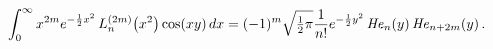 \[\int_{0}^{\infty}x^{2m}e^{-\frac{1}{2}x^{2}}\mathop{L^{(2m)}_{n}\/}\nolimits\!%
\left(x^{2}\right)\mathop{\cos\/}\nolimits\!\left(xy\right)dx=(-1)^{m}\sqrt{%
\tfrac{1}{2}\pi}\frac{1}{n!}e^{-\frac{1}{2}y^{2}}\mathop{\mathit{He}_{n}\/}%
\nolimits\!\left(y\right)\mathop{\mathit{He}_{n+2m}\/}\nolimits\!\left(y\right).\]
